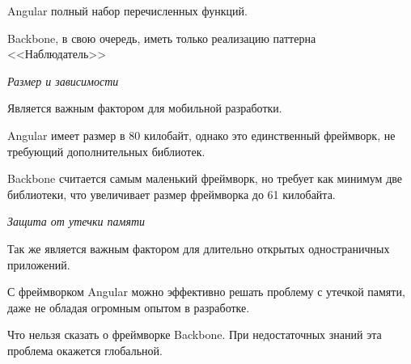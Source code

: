 Angular полный набор перечисленных функций.

Backbone, в свою очередь, иметь только реализацию паттерна <<Наблюдатель>>

{\itshape Размер и зависимости} 

Является важным фактором для мобильной разработки.

Angular имеет размер в 80 килобайт, однако это единственный фреймворк, не требующий дополнительных библиотек.

Backbone считается самым маленький фреймворк, но требует как минимум две библиотеки, что увеличивает размер фреймворка до 61 килобайта.

{\itshape Защита от утечки памяти} 

Так же является важным фактором для длительно открытых одностраничных приложений.

С фреймворком Angular можно эффективно решать проблему с утечкой памяти, даже не обладая огромным опытом в разработке.

Что нельзя сказать о фреймворке Backbone. При недостаточных знаний эта проблема окажется глобальной.

